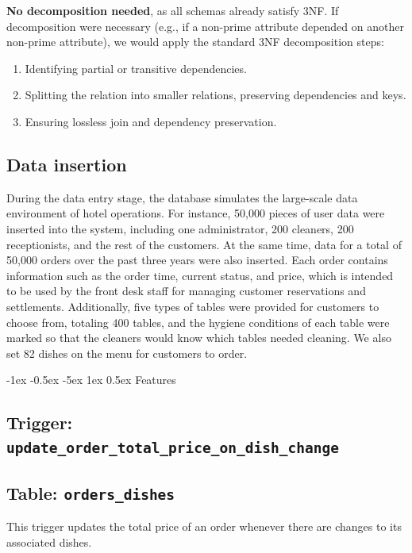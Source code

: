 \documentclass[12pt]{article}
\makeatletter
\renewcommand\section{\@startsection{section}{1}{\z@}%
    {-1ex \@plus -0.5ex \@minus -5ex} %
    {1ex \@plus 0.5ex} %
    {\normalfont\Large\bfseries}} %
\makeatother
\begin{document}
\textbf{No decomposition needed}, as all schemas already satisfy 3NF. If decomposition were necessary (e.g., if a non-prime attribute depended on another non-prime attribute), we would apply the standard 3NF decomposition steps:
\begin{enumerate}
    \item Identifying partial or transitive dependencies.
    \item Splitting the relation into smaller relations, preserving dependencies and keys.
    \item Ensuring lossless join and dependency preservation.
\end{enumerate}




\subsection{Data insertion}
During the data entry stage, the database simulates the large-scale data environment of hotel operations. For instance, 50,000 pieces of user data were inserted into the system, including one administrator, 200 cleaners, 200 receptionists, and the rest of the customers. At the same time, data for a total of 50,000 orders over the past three years were also inserted. Each order contains information such as the order time, current status, and price, which is intended to be used by the front desk staff for managing customer reservations and settlements. Additionally, five types of tables were provided for customers to choose from, totaling 400 tables, and the hygiene conditions of each table were marked so that the cleaners would know which tables needed cleaning. We also set 82 dishes on the menu for customers to order.






\section{Features}

\subsection{Trigger: \texttt{update\_order\_total\_price\_on\_dish\_change}}

\subsection*{Table: \texttt{orders\_dishes}}
This trigger updates the total price of an order whenever there are changes to its associated dishes.
\end{document}
